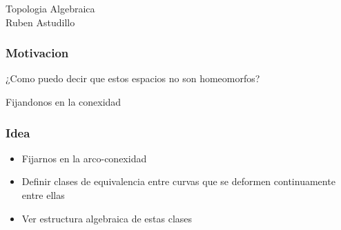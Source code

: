 \documentclass[xetex,mathserif,serif]{beamer}
\begin{document}
  \begin{frame}
    \begin{center}
      Topologia Algebraica \\
      Ruben Astudillo
    \end{center}
  \end{frame}

  \begin{frame}
    \frametitle{Motivacion}


    \begin{center}
    ¿Como puedo decir que estos espacios no son homeomorfos?
    \end{center}

    \pause

    \begin{center}
    Fijandonos en la conexidad
    \end{center}
  \end{frame}

  \begin{frame}
    \frametitle{Idea}
    \begin{itemize}
    \item Fijarnos en la arco-conexidad
    \item Definir clases de equivalencia entre curvas que se deformen
      continuamente entre ellas
    \item Ver estructura algebraica de estas clases
    \end{itemize}
  \end{frame}
\end{document}
